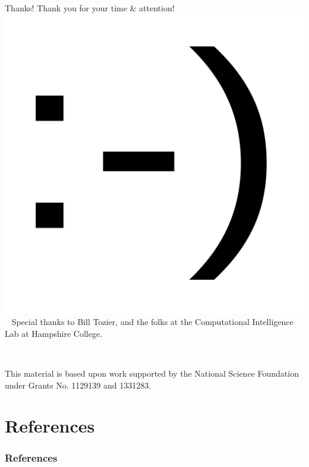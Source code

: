\documentclass{beamer}
\begin{document}
\begin{frame}{Thanks!}
\center \Large
Thank you for your time \& attention! \\ \medskip
\includegraphics[width=.1\textwidth]{Illustrations/smile.png} \\ \medskip
\normalsize
~
Special thanks to Bill Tozier, and the folks at the Computational Intelligence Lab at Hampshire College.

~

This material is based upon work supported by the National Science Foundation under 
Grants No. 1129139 and 1331283.

\end{frame}


\section*{References}

\begin{frame}[allowframebreaks]
\frametitle{References}


\end{frame}
\end{document}

